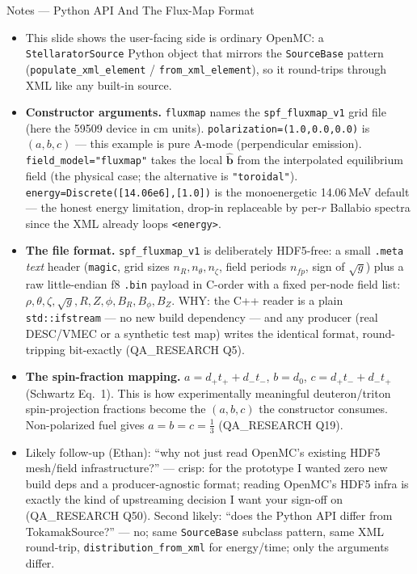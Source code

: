 \documentclass[11pt,aspectratio=169]{beamer}
\newcommand{\bhat}{\hat{\mathbf{b}}}
\begin{document}
\begin{frame}[allowframebreaks]{Notes --- Python API And The Flux-Map Format}
{\color{red}\footnotesize
\begin{itemize}
\item This slide shows the user-facing side is ordinary OpenMC: a \texttt{StellaratorSource} Python
      object that mirrors the \texttt{SourceBase} pattern (\texttt{populate\_xml\_element} /
      \texttt{from\_xml\_element}), so it round-trips through XML like any built-in source.
\item \textbf{Constructor arguments.} \texttt{fluxmap} names the \texttt{spf\_fluxmap\_v1} grid file
      (here the 59509 device in cm units). \texttt{polarization=(1.0,0.0,0.0)} is $(a,b,c)$ --- this
      example is pure A-mode (perpendicular emission). \texttt{field\_model="fluxmap"} takes the local
      $\bhat$ from the interpolated equilibrium field (the physical case; the alternative is
      \texttt{"toroidal"}). \texttt{energy=Discrete([14.06e6],[1.0])} is the monoenergetic
      14.06\,MeV default --- the honest energy limitation, drop-in replaceable by per-$r$ Ballabio
      spectra since the XML already loops \texttt{<energy>}.
\item \textbf{The file format.} \texttt{spf\_fluxmap\_v1} is deliberately HDF5-free: a small
      \texttt{.meta} \emph{text} header (\texttt{magic}, grid sizes $n_R,n_\theta,n_\zeta$, field
      periods $n_{fp}$, sign of $\sqrt{g}$) plus a raw little-endian f8 \texttt{.bin} payload in
      C-order with a fixed per-node field list: $\rho,\theta,\zeta,\sqrt{g},R,Z,\phi,B_R,B_\phi,B_Z$.
      WHY: the C++ reader is a plain \texttt{std::ifstream} --- no new build dependency --- and any
      producer (real DESC/VMEC or a synthetic test map) writes the identical format, round-tripping
      bit-exactly (QA\_RESEARCH Q5).
\item \textbf{The spin-fraction mapping.} $a=d_+t_+ + d_-t_-$, $b=d_0$, $c=d_+t_- + d_-t_+$
      (Schwartz Eq.\ 1). This is how experimentally meaningful deuteron/triton spin-projection
      fractions become the $(a,b,c)$ the constructor consumes. Non-polarized fuel gives
      $a=b=c=\tfrac13$ (QA\_RESEARCH Q19).
\item Likely follow-up (Ethan): ``why not just read OpenMC's existing HDF5 mesh/field
      infrastructure?'' --- crisp: for the prototype I wanted zero new build deps and a
      producer-agnostic format; reading OpenMC's HDF5 infra is exactly the kind of upstreaming
      decision I want your sign-off on (QA\_RESEARCH Q50). Second likely: ``does the Python API differ
      from TokamakSource?'' --- no; same \texttt{SourceBase} subclass pattern, same XML round-trip,
      \texttt{distribution\_from\_xml} for energy/time; only the arguments differ.
\end{itemize}
}
\end{frame}
\end{document}
